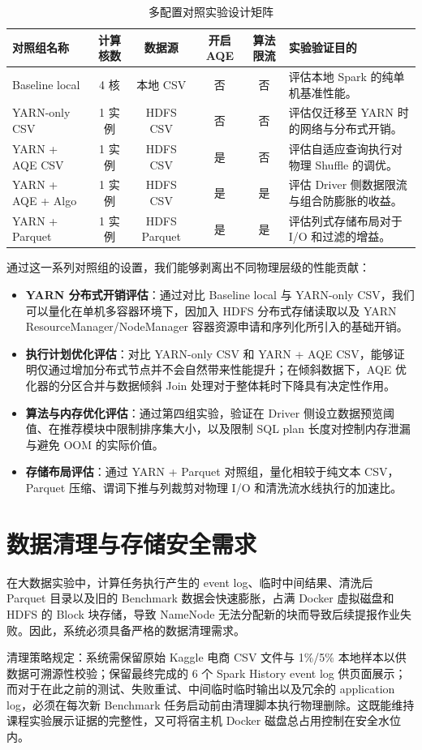 \renewcommand{\tabularxcolumn}[1]{m{#1}}
\begin{table}[htbp]
\centering
\caption{多配置对照实验设计矩阵}
\label{tab:experiment-groups}
\begin{tabularx}{\textwidth}{l c c c c>{\small}X}
\toprule
\textbf{对照组名称} & \textbf{计算核数} & \textbf{数据源} & \textbf{开启 AQE} & \textbf{算法限流} & \textbf{实验验证目的} \\
\midrule
Baseline local & 4 核 & 本地 CSV & 否 & 否 & 评估本地 Spark 的纯单机基准性能。 \\
YARN-only CSV & 1 实例 & HDFS CSV & 否 & 否 & 评估仅迁移至 YARN 时的网络与分布式开销。 \\
YARN + AQE CSV & 1 实例 & HDFS CSV & 是 & 否 & 评估自适应查询执行对物理 Shuffle 的调优。 \\
YARN + AQE + Algo & 1 实例 & HDFS CSV & 是 & 是 & 评估 Driver 侧数据限流与组合防膨胀的收益。 \\
YARN + Parquet & 1 实例 & HDFS Parquet & 是 & 是 & 评估列式存储布局对于 I/O 和过滤的增益。 \\
\bottomrule
\end{tabularx}
\end{table}

通过这一系列对照组的设置，我们能够剥离出不同物理层级的性能贡献：
\begin{itemize}
    \item \textbf{YARN 分布式开销评估}：通过对比 Baseline local 与 YARN-only CSV，我们可以量化在单机多容器环境下，因加入 HDFS 分布式存储读取以及 YARN ResourceManager/NodeManager 容器资源申请和序列化所引入的基础开销。
    \item \textbf{执行计划优化评估}：对比 YARN-only CSV 和 YARN + AQE CSV，能够证明仅通过增加分布式节点并不会自然带来性能提升；在倾斜数据下，AQE 优化器的分区合并与数据倾斜 Join 处理对于整体耗时下降具有决定性作用。
    \item \textbf{算法与内存优化评估}：通过第四组实验，验证在 Driver 侧设立数据预览阈值、在推荐模块中限制排序集大小，以及限制 SQL plan 长度对控制内存泄漏与避免 OOM 的实际价值。
    \item \textbf{存储布局评估}：通过 YARN + Parquet 对照组，量化相较于纯文本 CSV，Parquet 压缩、谓词下推与列裁剪对物理 I/O 和清洗流水线执行的加速比。

\end{itemize}

\section{数据清理与存储安全需求}

在大数据实验中，计算任务执行产生的 event log、临时中间结果、清洗后 Parquet 目录以及旧的 Benchmark 数据会快速膨胀，占满 Docker 虚拟磁盘和 HDFS 的 Block 块存储，导致 NameNode 无法分配新的块而导致后续提报作业失败。因此，系统必须具备严格的数据清理需求。

清理策略规定：系统需保留原始 Kaggle 电商 CSV 文件与 1\%/5\% 本地样本以供数据可溯源性校验；保留最终完成的 6 个 Spark History event log 供页面展示；而对于在此之前的测试、失败重试、中间临时临时输出以及冗余的 application log，必须在每次新 Benchmark 任务启动前由清理脚本执行物理删除。这既能维持课程实验展示证据的完整性，又可将宿主机 Docker 磁盘总占用控制在安全水位内。
